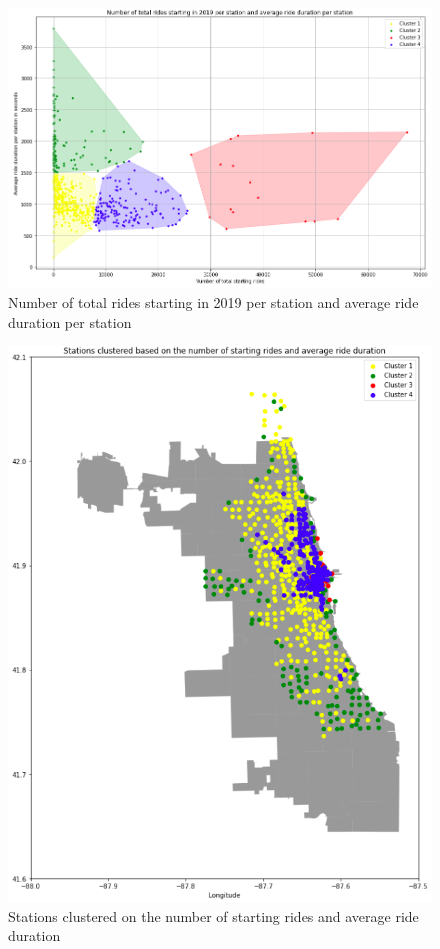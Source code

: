 \begin{figure}[H]
   \centering
    \includegraphics[width=0.8\linewidth]{./Figures/BC_ABB12.png}
    \caption{Number of total rides starting in 2019 per station and average ride duration per station}
    \label{BCABB12}
\end{figure}



\begin{figure}[H]
   \centering
    \includegraphics[width=0.8\linewidth]{./Figures/BC_ABB13.png}
    \caption{Stations clustered on the number of starting rides and average ride duration}
    \label{BCABB13}
\end{figure}

